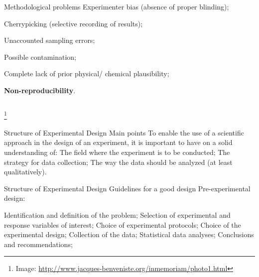 \documentclass[t]{beamer}
\begin{document}
\begin{ftst}
\vone
\begin{columns}
	\begin{block}{Methodological problems}
	\small
	\bitems Experimenter bias (absence of proper blinding);
		\item Cherrypicking (selective recording of results);
		\item Unaccounted sampling errors;
		\item Possible contamination;
		\item Complete lack of prior physical/ chemical plausibility;
		\item \textbf{Non-reproducibility}.
	\eitem
\end{block}
\end{columns}
\let\thefootnote\relax\footnote{\tiny Image: \url{http://www.jacques-benveniste.org/inmemoriam/photo1.html}}
\end{ftst}


\begin{ftst}
{Structure of Experimental Design}
{Main points}
To enable the use of a scientific approach in the design of an experiment, it is important to have on a solid understanding of:
\vhalf
\bitems The field where the experiment is to be conducted;
	\spitem The strategy for data collection;
	\spitem The way the data should be analyzed (at least qualitatively).
\eitem
\end{ftst}


\begin{ftst}
{Structure of Experimental Design}
{Guidelines for a good design}
\bitems Pre-experimental design:

	\bitems Identification and definition of the problem;
		\spitem Selection of experimental and response variables of interest;
		\spitem Choice of experimental protocols;
	\eitem
	\spitem Choice of the experimental design;
	\spitem Collection of the data;
	\spitem Statistical data analyses;
	\spitem Conclusions and recommendations;
\eitem
\end{ftst}

\end{document}
